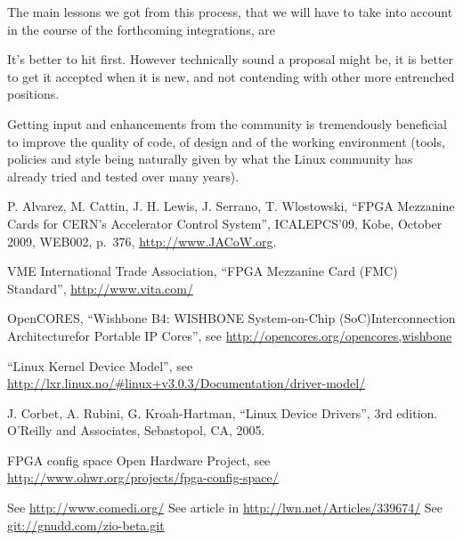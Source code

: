 \documentclass{JAC2003}
\begin{document}
The main lessons we got from this process, that we will have to take
into account in the course of the forthcoming integrations, are
\begin{Itemize}
\item It's better to hit first. However technically sound a proposal
might be, it is better to get it accepted when it is new, and not
contending with other more entrenched positions.
\item Getting input and enhancements from the community is tremendously
beneficial to improve the quality of code, of design and of the working
environment (tools, policies and style being naturally given by what the
Linux community has already tried and tested over many years).
\end{Itemize}

\begin{thebibliography}{9}   %

P. Alvarez, M. Cattin, J. H. Lewis, J. Serrano, T. Wlostowski,
``FPGA Mezzanine Cards for CERN’s Accelerator Control System'',
ICALEPCS'09, Kobe, October 2009, WEB002, p.~376,
\url{http://www.JACoW.org}.

VME International Trade Association,
``FPGA Mezzanine Card (FMC) Standard'', \url{http://www.vita.com/}

OpenCORES,
``Wishbone B4: WISHBONE System-on-Chip (SoC)Interconnection
Architecturefor Portable IP Cores'',
see \url{http://opencores.org/opencores,wishbone}

``Linux Kernel Device Model'',
see \url{http://lxr.linux.no/#linux+v3.0.3/Documentation/driver-model/}

J. Corbet, A. Rubini, G. Kroah-Hartman, ``Linux Device Drivers'', 3rd
edition. O'Reilly and Associates, Sebastopol, CA, 2005.

 FPGA config space Open Hardware
Project, see
\url{http://www.ohwr.org/projects/fpga-config-space/}

 See \url{http://www.comedi.org/}
 See article in \url{http://lwn.net/Articles/339674/}
 See \url{git://gnudd.com/zio-beta.git}

\end{thebibliography}
\end{document}
